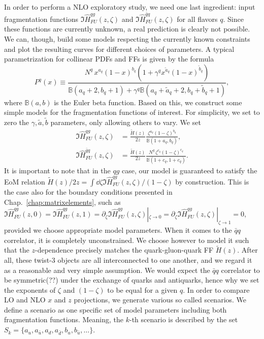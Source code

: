 In order to perform a NLO exploratory study, we need one last ingredient: input fragmentation functions $\Im \hat{H}^{qg}_{FU}(z,\zeta)$ and  $\Im \hat{H}^{\bar{q}q}_{FU}(z,\zeta)$ for all flavors $q$. Since these functions are currently unknown, a real prediction is clearly not possible. We can, though, build some models respecting the currently known constraints and plot the resulting curves for different choices of parameters. A typical parametrization for collinear PDFs and FFs is given by the formula \cite{Gamberg2022Htilde}
\begin{equation}
    P^q(x) \equiv \frac{N^q\, x^{a_q} (1-x)^{b_q}\left( 1+\gamma^q x^{\tilde{a}_q}(1-x)^{\tilde{b}_q}\right)}{\mathbb{B}(a_q+2,b_q+1) + \gamma^q \mathbb{B}(a_q+\tilde{a}_q+2 , b_q + \tilde{b}_q +1)},
\end{equation} 
where $\mathbb{B}(a,b)$ is the Euler beta function. Based on this, we construct some simple models for the fragmentation functions of interest. For simplicity, we set to zero the $\gamma,\tilde{a},\tilde{b}$ parameters, only allowing others to vary. We set
\begin{equation}
    \begin{aligned}
        \Im \hat{H}^{qg}_{FU}(z,\zeta) &= \frac{\tilde{H}(z)}{2 z} \frac{\zeta^{a_q} (1-\zeta)^{b_q}}{\mathbb{B}(1+a_q,b_q)},\\
        \Im \hat{H}^{\bar{q}q}_{FU}(z,\zeta) &= \frac{\tilde{H}(z)}{2 z} \frac{N^q \,\zeta^{c_q} (1-\zeta)^{c_q}}{\mathbb{B}(1+c_q,1+c_q)}.
    \end{aligned}
\end{equation}
It is important to note that in the $qg$ case, our model is guaranteed to satisfy the EoM relation $\tilde{H}(z)/2z=\int\dd\zeta \Im \hat{H}^{qg}_{FU}(z,\zeta)/(1-\zeta)$ by construction. This is the case also for the boundary conditions presented in Chap.~\ref{chap:matrixelements}, such as $\Im \hat{H}^{qg}_{FU}(z,0)=\Im \hat{H}^{qg}_{FU}(z,1)= \partial_\zeta \Im \hat{H}^{qg}_{FU}(z,\zeta)|_{\zeta\to 0}=\partial_\zeta \Im \hat{H}^{qg}_{FU}(z,\zeta)|_{\zeta\to 1}=0$, provided we choose appropriate model parameters. When it comes to the $\bar{q}q$ correlator, it is completely unconstrained. We choose however to model it such that the $z$-dependence precisely matches the quark-gluon-quark FF $\tilde{H}(z)$. After all, these twist-3 objects are all interconnected to one another, and we regard it as a reasonable and very simple assumption. We would expect the $\bar{q}q$ correlator to be symmetric(??) under the exchange of quarks and antiquarks, hence why we set the exponents of $\zeta$ and $(1-\zeta)$ to be equal for a given $q$. 
In order to compare LO and NLO $x$ and $z$ projections, we generate various so called scenarios. We define a scenario as one specific set of model parameters including both fragmentation functions. Meaning, the $k$-th scenario is described by the set $S_k=\{a_u,a_{\bar{u}},a_d,a_{\bar{d}},b_u,b_{\bar{u}},\dots \}$.









\clearpage